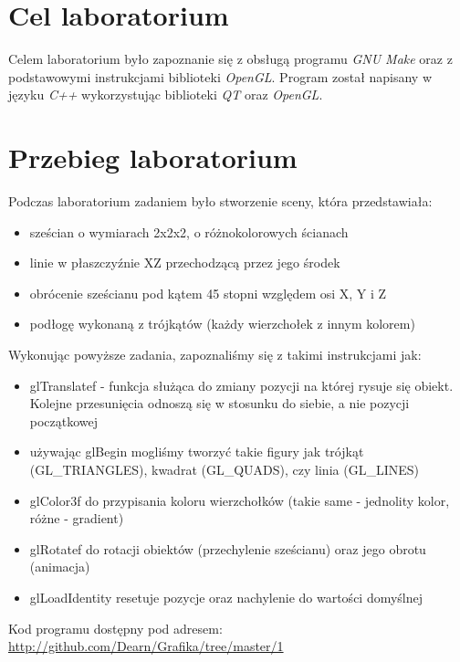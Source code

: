 \documentclass{article}
\begin{document}

\newpage
\section{Cel laboratorium}
Celem laboratorium było zapoznanie się z obsługą programu \emph{GNU Make} oraz z podstawowymi instrukcjami \newline biblioteki \emph{OpenGL}. Program został napisany w języku \emph{C++} wykorzystując biblioteki \emph{QT} oraz \emph{OpenGL}.
\section{Przebieg laboratorium}
Podczas laboratorium zadaniem było stworzenie sceny, która przedstawiała:
\begin{itemize}
\item sześcian o wymiarach 2x2x2, o różnokolorowych ścianach
\item linie w płaszczyźnie XZ przechodzącą przez jego środek
\item obrócenie sześcianu pod kątem 45 stopni względem osi X, Y i Z
\item podłogę wykonaną z trójkątów (każdy wierzchołek z innym kolorem)
\end{itemize}
Wykonując powyższe zadania, zapoznaliśmy się z takimi instrukcjami jak:
\begin{itemize}
\item \textsf{glTranslatef} - funkcja służąca do zmiany pozycji na której rysuje się obiekt. Kolejne przesunięcia odnoszą się w stosunku do siebie, a nie pozycji początkowej
\item używając \textsf{glBegin} mogliśmy tworzyć takie figury jak trójkąt (\textsf{GL\_TRIANGLES}), kwadrat (\textsf{GL\_QUADS}), czy linia (\textsf{GL\_LINES})
\item \textsf{glColor3f} do przypisania koloru wierzchołków (takie same - jednolity kolor, różne - gradient)
\item \textsf{glRotatef} do rotacji obiektów (przechylenie sześcianu) oraz jego obrotu (animacja)
\item \textsf{glLoadIdentity} resetuje pozycje oraz nachylenie do wartości domyślnej


\end{itemize}
\vfill
Kod programu dostępny pod adresem: \newline \url{http://github.com/Dearn/Grafika/tree/master/1}
\end{document}
